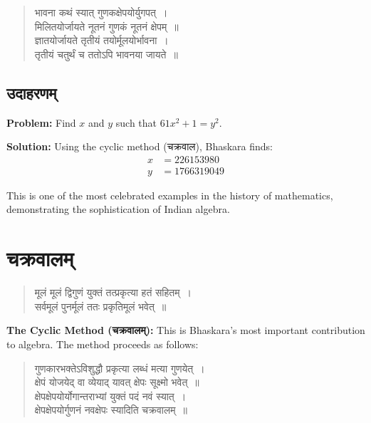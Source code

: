 \documentclass[11pt,a4paper]{article}
\newcommand{\dev}[1]{{\devanagarifont #1}}
\begin{document}
\begin{verse}
\devanagarifont
\centering
\color{versecolor}
\dev{भावना कथं स्यात् गुणकक्षेपयोर्युगपत्~।}\\
\dev{मिलितयोर्जायते नूतनं गुणकं नूतनं क्षेपम्~॥}\\[0.3cm]
\dev{ज्ञातयोर्जायते तृतीयं तयोर्मूलयोर्भावना~।}\\
\dev{तृतीयं चतुर्थं च ततोऽपि भावनया जायते~॥}
\end{verse}

\subsection*{\dev{उदाहरणम्}}

\textbf{Problem:} Find $x$ and $y$ such that $61x^2 + 1 = y^2$.

\textbf{Solution:} Using the cyclic method (\dev{चक्रवाल}), Bhaskara finds:
\begin{align*}
x &= 226153980 \\
y &= 1766319049
\end{align*}

This is one of the most celebrated examples in the history of mathematics, demonstrating the sophistication of Indian algebra.

\clearpage

\section*{\dev{चक्रवालम्}}
\addcontentsline{toc}{section}{\dev{चक्रवालम्}}

\begin{verse}
\devanagarifont
\centering
\color{versecolor}
\dev{मूलं मूलं द्विगुणं युक्तं तत्प्रकृत्या हतं सहितम्~।}\\
\dev{सर्वमूलं पुनर्मूलं ततः प्रकृतिमूलं भवेत्~॥}
\end{verse}

\textbf{The Cyclic Method (\dev{चक्रवालम्}):} This is Bhaskara's most important contribution to algebra. The method proceeds as follows:

\vspace{0.3cm}

\begin{verse}
\devanagarifont
\centering
\color{versecolor}
\dev{गुणकारभक्तेऽविशुद्धौ प्रकृत्या लब्धं मत्या गुणयेत्~।}\\
\dev{क्षेपं योजयेद् वा व्येयाद् यावत् क्षेपः सूक्ष्मो भवेत्~॥}\\[0.3cm]
\dev{क्षेपक्षेपयोर्योगान्तराभ्यां युक्तं पदं नवं स्यात्~।}\\
\dev{क्षेपक्षेपयोर्गुणनं नवक्षेपः स्यादिति चक्रवालम्~॥}
\end{verse}
\end{document}
